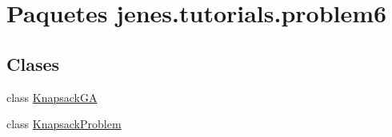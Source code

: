 \hypertarget{namespacejenes_1_1tutorials_1_1problem6}{\section{Paquetes jenes.\-tutorials.\-problem6}
\label{namespacejenes_1_1tutorials_1_1problem6}
}
\subsection*{Clases}
\begin{DoxyCompactItemize}
\item 
class \hyperlink{classjenes_1_1tutorials_1_1problem6_1_1_knapsack_g_a}{Knapsack\-G\-A}
\item 
class \hyperlink{classjenes_1_1tutorials_1_1problem6_1_1_knapsack_problem}{Knapsack\-Problem}
\end{DoxyCompactItemize}
